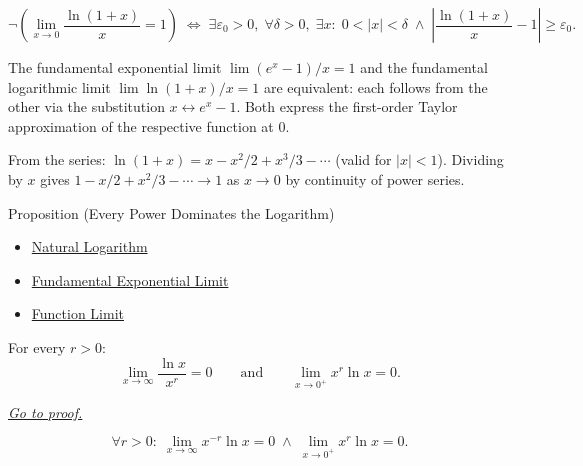 \begin{remark*}
\[
  \neg\left(\lim_{x\to 0}\frac{\ln(1+x)}{x}=1\right)
  \;\iff\;
  \exists\varepsilon_0>0,\;\forall\delta>0,\;\exists x:\;
  0<|x|<\delta \;\wedge\;
  \left|\frac{\ln(1+x)}{x}-1\right|\geq\varepsilon_0.
\]
\end{remark*}

\begin{remark*}
The fundamental exponential limit $\lim(e^x-1)/x = 1$ and the
fundamental logarithmic limit $\lim\ln(1+x)/x = 1$ are equivalent:
each follows from the other via the substitution $x \leftrightarrow
e^x - 1$. Both express the first-order Taylor approximation of the
respective function at $0$.
\end{remark*}

\begin{remark*}
From the series: $\ln(1+x) = x - x^2/2 + x^3/3 - \cdots$ (valid
for $|x| < 1$). Dividing by $x$ gives $1 - x/2 + x^2/3 - \cdots
\to 1$ as $x \to 0$ by continuity of power series.
\end{remark*}


\begin{propositionbox}{Proposition (Every Power Dominates the Logarithm)}

\begin{dependencies}
\begin{itemize}
  \item \hyperref[def:natural-logarithm]{Natural Logarithm}
  \item \hyperref[prop:limit-exponential-fundamental]{Fundamental Exponential Limit}
  \item \hyperref[def:limit-function]{Function Limit}
\end{itemize}
\end{dependencies}
\begin{proposition}
\label{prop:power-dominates-log}
For every $r > 0$:
\[
  \lim_{x \to \infty} \frac{\ln x}{x^r} = 0
  \qquad\text{and}\qquad
  \lim_{x \to 0^+} x^r \ln x = 0.
\]

\smallskip\noindent
\hyperref[prf:power-dominates-log]{\textit{Go to proof.}}
\end{proposition}
\end{propositionbox}\begin{remark*}
\[
  \forall r > 0 :\;
  \lim_{x \to \infty} x^{-r} \ln x = 0
  \;\wedge\;
  \lim_{x \to 0^+} x^r \ln x = 0.
\]
\end{remark*}

